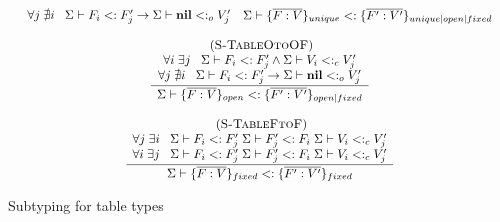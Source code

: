 \documentclass[10pt]{sigplanconf}
\newcommand{\Nil}{\mathbf{nil}}
\newcommand{\mylabel}[1]{\; (\textsc{#1})}
\newcommand{\senv}{\Sigma}
\newcommand{\subtype}{<:}
\begin{document}
\begin{figure}[t]
{\[\begin{array}{c}
\begin{array}{c}
{\begin{array}{c}
	\forall j  \; \nexists i \;\;\;
	\senv \vdash F_{i} \subtype F_{j}' \to \senv \vdash \Nil \subtype_{o} V_{j}'
	\end{array}}
{\begin{array}{c}
	\senv \vdash \{\overline{F:V}\}_{unique} \subtype
	\{\overline{F^\prime:V^\prime}\}_{unique|open|fixed}
	\end{array}}
\end{array}\\\\
\begin{array}{c}
\mylabel{S-TableOtoOF}\\
\dfrac{\begin{array}{c}
	\forall i \; \exists j \;\;\;
	\senv \vdash F_{i} \subtype F_{j}' \land \senv \vdash V_{i} \subtype_{c} V_{j}' \\
	\forall j \; \nexists i \;\;\;
	\senv \vdash F_{i} \subtype F_{j}' \to \senv \vdash \Nil \subtype_{o} V_{j}'
	\end{array}}
{\begin{array}{c}
	\senv \vdash \{\overline{F:V}\}_{open} \subtype
	\{\overline{F^\prime:V^\prime}\}_{open|fixed}
	\end{array}}
\end{array}\\\\
\begin{array}{c}
\mylabel{S-TableFtoF}\\
\dfrac{\begin{array}{c}
	\forall j \; \exists i \;\;\;
	\senv \vdash F_{i} \subtype F_{j}' \;
	\senv \vdash F_{j}' \subtype F_{i} \;
	\senv \vdash V_{i} \subtype_{c} V_{j}'\\
	\forall i \; \exists j \;\;\;
	\senv \vdash F_{i} \subtype F_{j}' \;
	\senv \vdash F_{j}' \subtype F_{i} \;
	\senv \vdash V_{i} \subtype_{c} V_{j}'\\
	\end{array}}
{\senv \vdash \{\overline{F:V}\}_{fixed} \subtype
	\{\overline{F^\prime:V^\prime}\}_{fixed}}
\end{array}
\end{array}
\]
}
\caption{Subtyping for table types}
\label{fig:tablesub}
\end{figure}
\end{document}
